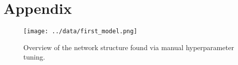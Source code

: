 \section{Appendix}
\label{sec:appendix}

\begin{figure}
    \centering
    \texttt{[image: ../data/first\_model.png]}
    \caption{Overview of the network structure found via manual hyperparameter tuning.}
    \label{fig:first_model}
\end{figure}